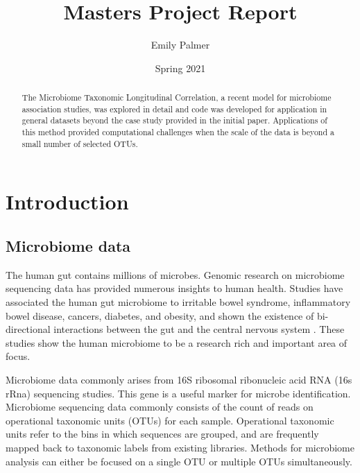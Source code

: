 \documentclass[12pt]{article}
\title{Masters Project Report}
\author{Emily Palmer}
\date{Spring 2021}
\begin{document}
\maketitle

\begin{abstract}
  The Microbiome Taxonomic Longitudinal Correlation, a recent model for microbiome association studies, was explored in detail and code was developed for application in general datasets beyond the case study provided in the initial paper. Applications of this method provided computational challenges when the scale of the data is beyond a small number of selected OTUs.
\end{abstract}




\section{Introduction}

\subsection{Microbiome data}
The human gut contains millions of microbes. Genomic research on microbiome sequencing data has provided numerous insights to human health. Studies have associated the human gut microbiome to irritable bowel syndrome, inflammatory bowel disease, cancers, diabetes, and obesity, and shown the existence of bi-directional interactions  between the gut and the central nervous system \cite{kinross2008human, mayer2015gut}. These studies show the human microbiome to be a research rich and important area of focus.


Microbiome data commonly arises from 16S ribosomal ribonucleic acid RNA (16s rRna) sequencing studies. This gene is a useful marker for microbe identification.  Microbiome sequencing data commonly consists of the count of reads on operational taxonomic units (OTUs) for each sample. Operational taxonomic units refer to the bins in which sequences are grouped, and are frequently mapped back to taxonomic labels from existing libraries. Methods for microbiome analysis can either be focused on a single OTU or multiple OTUs simultaneously.
\end{document}
